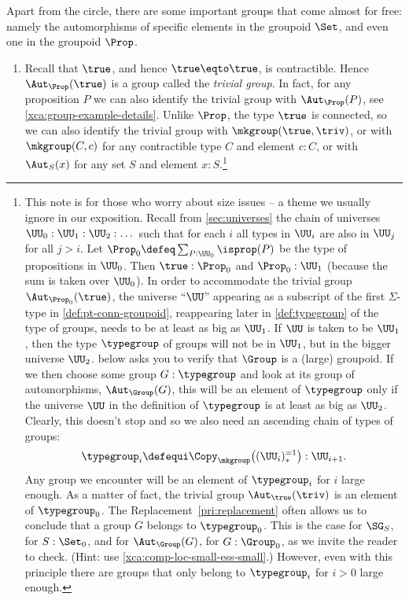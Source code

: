 \begin{example}\label{ex:groups}
  Apart from the circle, there are some important groups that come 
  almost for free: namely the automorphisms of specific elements
  in the groupoid $\Set$, and even one in the groupoid $\Prop$.
  \begin{enumerate}
  \item\label{ex:trivgroup}
  Recall that $\true$, and hence $\true \eqto \true$, is contractible.
  Hence $\Aut_\Prop(\true)$ is a group called the 
  \emph{trivial group}. 
  In fact, for any proposition $P$ we can also identify the trivial group 
  with $\Aut_\Prop(P)$, see \cref{xca:group-example-details}. 
  Unlike $\Prop$, the type $\true$ is connected,
  so we can also identify the trivial group with
  $\mkgroup (\true,\triv)$, or with $\mkgroup (C,c)$ for
  any contractible type $C$ and element $c:C$, or
  with $\Aut_{S}(x)$ for any set $S$ and element $x:S$.\footnote{%
This note is for those who worry about size issues -- a
theme we usually ignore in our exposition. 
Recall from \cref{sec:universes} the chain of
universes $\UU_0 : \UU_1 : \UU_2 : \dots$ such that for each $i$
all types in $\UU_i$ are also in $\UU_j$ for all $j>i$.
Let $\Prop_0 \defeq \sum_{P:\UU_0}\isprop(P)$ be the type of 
propositions in $\UU_0$. Then $\true:\Prop_0$ 
and $\Prop_0 : \UU_1$ (because the sum is taken over $\UU_0$).
In order to accommodate the trivial group $\Aut_{\Prop_0}(\true)$, 
the universe ``$\UU$'' appearing as a subscript of the first 
$\Sigma$-type in \cref{def:pt-conn-groupoid}, reappearing later in 
\cref{def:typegroup} of the type of groups,
needs to be at least as big as $\UU_1$. 
If $\UU$ is taken to be $\UU_1$, then the type $\typegroup$ of groups 
will not be in $\UU_1$, but in the bigger universe $\UU_2$.
 below asks you to verify that $\Group$
is a (large) groupoid. If we then choose some group $G:\typegroup$
and look at its group of automorphisms, $\Aut_\Group(G)$,
this will be an element of $\typegroup$ only if the universe $\UU$ in the
definition of $\typegroup$ is at least as big as $\UU_2$. Clearly, 
this doesn't stop and so we also need an ascending chain of types of groups:
  \[
    \typegroup_i \defequi \Copy_{\mkgroup}\bigl( (\UU_i)_*^{=1} \bigr) : \UU_{i+1}.
  \]
Any group we encounter will be an element of $\typegroup_i$ for $i$
large enough. As a matter of fact, the trivial group $\Aut_{\true}(\triv)$
is an element of $\typegroup_0$. The Replacement~\cref{pri:replacement}
often allows us to conclude that a group $G$ belongs to $\typegroup_0$.
This is the case for $\SG_S$, for $S:\Set_0$, and for $\Aut_\Group(G)$,
for $G:\Group_0$, as we invite the reader to check.
(Hint: use \cref{xca:comp-loc-small-ess-small}.)
However, even with this principle there are groups that only belong
to $\typegroup_i$ for $i>0$ large enough.

}
\end{enumerate}
\end{example}
